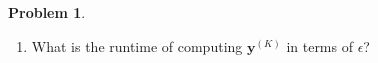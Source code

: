 \documentclass[10pt]{exam}
\theoremstyle{definition}
\newtheorem{problem}{Problem}
\newcommand{\p}{\mathbf P}
\newcommand{\pb}{\bar {\p}}
\newcommand{\pbb}{\bar {\pb}}
\newcommand{\x}{\mathbf x}
\newcommand{\y}{\mathbf y}
\newcommand{\ltwo}[1]{{\lVert {#1} \rVert}_2}
\begin{document}
\begin{problem}
\begin{enumerate}


            \vspace{3.5in}
        \item
            What is the runtime of computing $\y^{(K)}$ in terms of $\epsilon$?
            \vspace{4.5in}

        \newpage
%
%
%
    \end{enumerate}
\end{problem}
\end{document}
